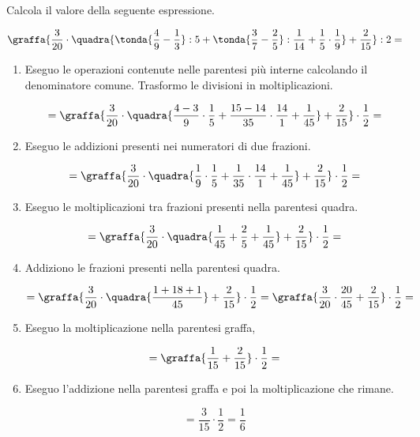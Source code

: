\begin{esempio}{}{}
  Calcola il valore della seguente espressione.

\[\graffa{
  \frac{3}{20}\cdot\quadra{
    \tonda{\frac{4}{9}-\frac{1}{3}} : 5 + 
    \tonda{\frac{3}{7}-\frac{2}{5}} :
    \frac{1}{14}+\frac{1}{5}\cdot\frac{1}{9}}+
  \frac{2}{15}} : 2=\]
\begin{enumerate} %
 \item 
Eseguo le operazioni contenute nelle parentesi più interne calcolando il 
denominatore comune. 
Trasformo le divisioni in moltiplicazioni.

\vspace{-1em}
\[= \graffa{
  \frac{3}{20}\cdot\quadra{
    \frac{4 - 3}{9} \cdot \frac{1}{5} + 
    \frac{15-14}{35}\cdot\frac{14}{1} +
    \frac{1}{45}} +
  \frac{2}{15}} \cdot \frac{1}{2}=
\]
 \item
Eseguo le addizioni presenti nei numeratori di due frazioni.

\vspace{-1em}
\[= \graffa{
  \frac{3}{20} \cdot \quadra{
    \frac{1}{9} \cdot \frac{1}{5} + 
    \frac{1}{35}\cdot\frac{14}{1} +
    \frac{1}{45}} +
  \frac{2}{15}} \cdot 
\frac{1}{2}=\]
 \item
Eseguo le moltiplicazioni tra frazioni presenti nella parentesi quadra.

\vspace{-1em}
\[= \graffa{
  \frac{3}{20} \cdot \quadra{\frac{1}{45} + \frac{2}{5} + \frac{1}{45}} +
  \frac{2}{15}} \cdot 
\frac{1}{2} =\]
 \item
Addiziono le frazioni presenti nella parentesi quadra.

\vspace{-1em}
\[= \graffa{
  \frac{3}{20} \cdot \quadra{\frac{1+18+1}{45}} +
  \frac{2}{15}} \cdot \frac{1}{2} =
\graffa{\frac{3}{20} \cdot \frac{20}{45} + \frac{2}{15}} \cdot 
\frac{1}{2} =\]
 \item
Eseguo la moltiplicazione nella parentesi graffa,

\vspace{-1em}
\[= \graffa{
  \frac{1}{15} + \frac{2}{15}} \cdot 
\frac{1}{2} =\]
 \item
Eseguo l'addizione nella parentesi graffa e poi la moltiplicazione che rimane.

\vspace{-1em}
\[=\frac{3}{15} \cdot \frac{1}{2} = \frac{1}{6}\]

\end{enumerate}

\end{esempio}

